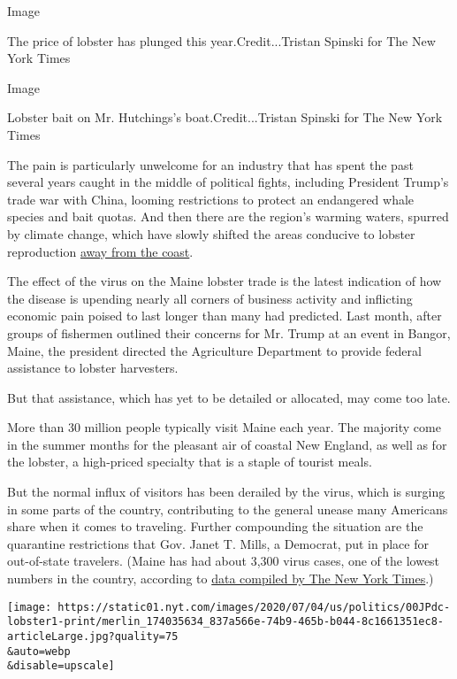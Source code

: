 Image

The price of lobster has plunged this year.Credit...Tristan Spinski for
The New York Times

Image

Lobster bait on Mr. Hutchings's boat.Credit...Tristan Spinski for The
New York Times

The pain is particularly unwelcome for an industry that has spent the
past several years caught in the middle of political fights, including
President Trump's trade war with China, looming restrictions to protect
an endangered whale species and bait quotas. And then there are the
region's warming waters, spurred by climate change, which have slowly
shifted the areas conducive to lobster reproduction
\href{https://www.nytimes.com/2018/06/21/climate/maine-lobsters.html}{away
from the coast}.

The effect of the virus on the Maine lobster trade is the latest
indication of how the disease is upending nearly all corners of business
activity and inflicting economic pain poised to last longer than many
had predicted. Last month, after groups of fishermen outlined their
concerns for Mr. Trump at an event in Bangor, Maine, the president
directed the Agriculture Department to provide federal assistance to
lobster harvesters.

But that assistance, which has yet to be detailed or allocated, may come
too late.

More than 30 million people typically visit Maine each year. The
majority come in the summer months for the pleasant air of coastal New
England, as well as for the lobster, a high-priced specialty that is a
staple of tourist meals.

But the normal influx of visitors has been derailed by the virus, which
is surging in some parts of the country, contributing to the general
unease many Americans share when it comes to traveling. Further
compounding the situation are the quarantine restrictions that Gov.
Janet T. Mills, a Democrat, put in place for out-of-state travelers.
(Maine has had about 3,300 virus cases, one of the lowest numbers in the
country, according to
\href{https://www.nytimes.com/interactive/2020/us/maine-coronavirus-cases.html}{data
compiled by The New York Times}.)

\texttt{[image: https://static01.nyt.com/images/2020/07/04/us/politics/00JPdc-lobster1-print/merlin\_174035634\_837a566e-74b9-465b-b044-8c1661351ec8-articleLarge.jpg?quality=75\\\&auto=webp\\\&disable=upscale]}

